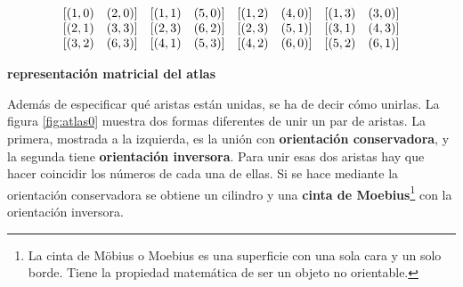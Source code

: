 $$
\begin{array}{c@{}c@{}c@{}c}
 \begin{array}{cc}
         [(1,0) & (2,0)]
  \end{array} & \begin{array}{cc}
         [(1,1) & (5,0)]
  \end{array} & \begin{array}{cc}
         [(1,2) & (4,0)]
  \end{array} &
  \begin{array}{cc}
         [(1,3) & (3,0)] 
  \end{array}
  \\
  \begin{array}{cc}
         [(2,1) & (3,3)]
  \end{array} & \begin{array}{cc}
         [(2,3) & (6,2)]
  \end{array} & \begin{array}{cc}
         [(2,3) & (5,1)] 
  \end{array} &
  \begin{array}{cc}
         [(3,1) & (4,3)]
  \end{array}
  \\
  \begin{array}{cc}
         [(3,2) & (6,3)]
  \end{array} & \begin{array}{cc}
         [(4,1) & (5,3)]
  \end{array} & \begin{array}{cc}
         [(4,2) & (6,0)] 
  \end{array} &
  \begin{array}{cc}
         [(5,2) & (6,1)] 
  \end{array}
\end{array}
$$   

\begin{center}
\textbf{\footnotesize{representación matricial del atlas}}
\end{center}

Además de especificar qué aristas están unidas, se ha de decir cómo unirlas. La figura \ref{fig:atlas0} muestra dos formas diferentes de unir un par de aristas. La primera, mostrada a la izquierda, es la unión con \textbf{orientación conservadora}, y la segunda tiene \textbf{orientación inversora}. Para unir esas dos aristas hay que hacer coincidir los números de cada una de ellas. Si se hace mediante la orientación conservadora se obtiene un cilindro y una \textbf{cinta de Moebius}\footnote{La cinta de Möbius o Moebius es una superficie con una sola cara y un solo borde. Tiene la propiedad matemática de ser un objeto no orientable.} con la orientación inversora.

